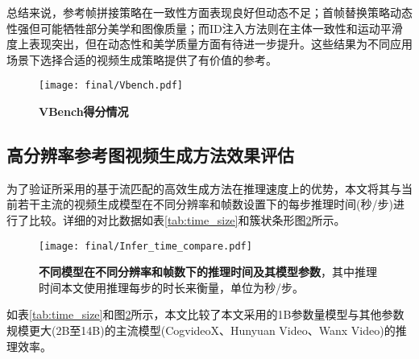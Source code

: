 总结来说，参考帧拼接策略在一致性方面表现良好但动态不足；首帧替换策略动态性强但可能牺牲部分美学和图像质量；而ID注入方法则在主体一致性和运动平滑度上表现突出，但在动态性和美学质量方面有待进一步提升。这些结果为不同应用场景下选择合适的视频生成策略提供了有价值的参考。


\begin{figure}[htbp]
    \centering
    \texttt{[image: final/Vbench.pdf]}
    \caption{\textbf{VBench得分情况}}
    \label{fig:vbench}
\end{figure}

\subsection{高分辨率参考图视频生成方法效果评估} %
为了验证所采用的基于流匹配的高效生成方法在推理速度上的优势，本文将其与当前若干主流的视频生成模型在不同分辨率和帧数设置下的每步推理时间(秒/步)进行了比较。详细的对比数据如表\ref{tab:time_size}和簇状条形图\ref{fig:time_size}所示。
\begin{table}[htbp]
    \centering
    \caption{不同模型参数量及在不同分辨率和帧数下的推理时间(秒/步)对比}
    \label{tab:time_size}
\end{table}
\begin{figure}[htbp]
    \centering
    \texttt{[image: final/Infer\_time\_compare.pdf]}
    \caption{\textbf{不同模型在不同分辨率和帧数下的推理时间及其模型参数}，其中推理时间本文使用推理每步的时长来衡量，单位为秒/步。
    }
    \label{fig:time_size}
\end{figure}
如表\ref{tab:time_size}和图\ref{fig:time_size}所示，本文比较了本文采用的1B参数量模型与其他参数规模更大(2B至14B)的主流模型(CogvideoX、Hunyuan Video、Wanx Video)的推理效率。

